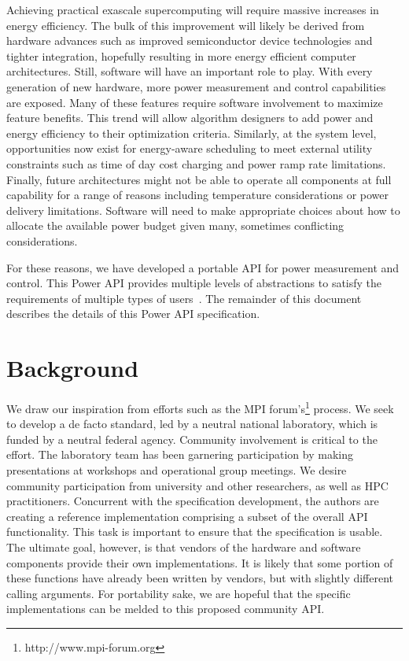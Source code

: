 Achieving practical exascale supercomputing will require massive increases in energy efficiency.  
The bulk of this improvement will likely be derived from hardware advances such as improved semiconductor device technologies and tighter integration, hopefully resulting in more energy efficient computer architectures.  
Still, software will have an important role to play.  
With every generation of new hardware, more power measurement and control capabilities are exposed. 
Many of these features require software involvement to maximize feature benefits.
This trend will allow algorithm designers to add power and energy efficiency to their optimization criteria.  
Similarly, at the system level, opportunities now exist for energy-aware scheduling to meet external utility constraints such as time of day cost charging and power ramp rate limitations.  
Finally, future architectures might not be able to operate all components at full capability for a range of reasons including temperature considerations or power delivery limitations.
Software will need to make appropriate choices about how to allocate the available power budget given many, sometimes conflicting considerations.

For these reasons, we have developed a portable API for power measurement and control.  
This Power API provides multiple levels of abstractions to satisfy the requirements of multiple types of users~\cite{Laros:2013:PwrUseCase}.
The remainder of this document describes the details of this Power API specification.


\section{Background}\label{sec:Background}
We draw our inspiration from efforts such as the MPI forum's\footnote{http://www.mpi-forum.org} process. 
We seek to develop a de facto standard, led by a neutral national laboratory, which is funded by a neutral federal agency.
Community involvement is critical to the effort.
The laboratory team has been garnering participation by making presentations at workshops and operational group meetings. 
We desire community participation from university and other researchers, as well as HPC practitioners. 
Concurrent with the specification development, the authors are creating a reference implementation comprising a subset of the overall API functionality. 
This task is important to ensure that the specification is usable. 
The ultimate goal, however, is that vendors of the hardware and software components provide their own implementations. 
It is likely that some portion of these functions have already been written by vendors, but with slightly different calling arguments.
For portability sake, we are hopeful that the specific implementations can be melded to this proposed community API.

